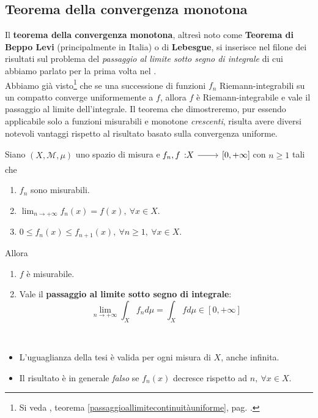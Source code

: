 \subsection{Teorema della convergenza monotona}
Il \textbf{teorema della convergenza monotona}, altresì noto come \textbf{Teorema di Beppo Levi} (principalmente in Italia) o di \textbf{Lebesgue}, si inserisce nel filone dei risultati sul problema del \textit{passaggio al limite sotto segno di integrale} di cui abbiamo parlato per la prima volta nel .\\
Abbiamo già visto\footnote{Si veda , teorema \ref{passaggioallimitecontinuitàuniforme}, pag. \pageref{passaggioallimitecontinuitàuniforme}.} che se una successione di funzioni $f_n$ Riemann-integrabili su un compatto converge uniformemente a $f$, allora $f$ è Riemann-integrabile e vale il passaggio al limite dell'integrale. Il teorema che dimostreremo, pur essendo applicabile solo a funzioni misurabili e monotone \textit{crescenti}, risulta avere diversi notevoli vantaggi rispetto al risultato basato sulla convergenza uniforme.
\begin{theorema}\label{thmconvergenzamonotona}
	Siano $\left(X,\mathcal{M},\mu\right)$ uno spazio di misura e $\funz{f_n,f}{X}{\left[0,+\infty\right]}$ con $n\geq 1$ tali che
	\begin{enumerate}[label=(\alph*)]
		\item $f_n$ sono misurabili.
		\item $\displaystyle\lim_{n\to+\infty}f_n(x)=f(x),\ \forall x\in X$.
		\item $0\leq f_n(x)\leq f_{n+1}(x),\ \forall n\geq 1,\ \forall x\in X$.
	\end{enumerate}
Allora
\begin{enumerate}
	\item $f$ è misurabile.
	\item Vale il \textbf{passaggio al limite sotto segno di integrale}:
	\begin{equation}
		\lim_{n\to+\infty}\int_Xf_nd\mu=\int_Xfd\mu\in\left[0,+\infty\right]
	\end{equation}
\end{enumerate}
\end{theorema}
\begin{observes}~{}
	\begin{itemize}
		\item L'uguaglianza della tesi è valida per ogni misura di $X$, anche infinita.
		\item Il risultato è in generale \textit{falso} se $f_n(x)$ decresce rispetto ad $n,\ \forall x\in X$.
	\end{itemize}
\end{observes}
